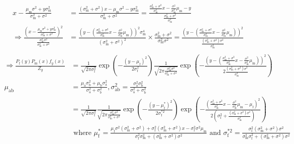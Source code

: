 \documentclass{article}\usepackage[]{graphicx}\usepackage[]{color}
\newcommand{\x}[1]{\text{#1}}
\begin{document}
\begin{landscape}
\begin{align*}
\\ x-\frac{\mu_\x{m}\sigma^2+y\sigma_\x{m}^2}{\sigma_\x{m}^2+\sigma^2}&=\frac{(\sigma_\x{m}^2+\sigma^2)x-\mu_\x{m}\sigma^2-y\sigma_\x{m}^2}{\sigma_\x{m}^2+\sigma^2}=\frac{\frac{\sigma_\x{m}^2+\sigma^2}{\sigma_\x{m}^2}x-\frac{\sigma^2}{\sigma_\x{m}^2}\mu_\x{m}-y}{\frac{\sigma_\x{m}^2+\sigma^2}{\sigma_\x{m}^2}}
\\ \Rightarrow \frac{(x-\frac{\mu_\x{m}\sigma^2+y\sigma_\x{m}^2}{\sigma_\x{m}^2+\sigma^2})^2}{\frac{\sigma_\x{m}^2\sigma^2}{\sigma_\x{m}^2+\sigma^2}}&=\frac{\left(y-\left(\frac{\sigma_\x{m}^2+\sigma^2}{\sigma_\x{m}^2}x-\frac{\sigma^2}{\sigma_\x{m}^2}\mu_\x{m}\right)\right)^2\sigma_\x{m}^4}{(\sigma_\x{m}^2+\sigma^2)^2}\times\frac{\sigma_\x{m}^2+\sigma^2}{\sigma_\x{m}^2\sigma^2}=\frac{\left(y-\left(\frac{\sigma_\x{m}^2+\sigma^2}{\sigma_\x{m}^2}x-\frac{\sigma^2}{\sigma_\x{m}^2}\mu_\x{m}\right)\right)^2}{\frac{(\sigma_\x{m}^2+\sigma^2)\sigma^2}{\sigma_\x{m}^2}}
\end{align*}
\begin{align*}
\\ \Rightarrow \frac{P_\x{f}(y)P_\x{m}(x)f_y(x)}{Z_y}&=\frac{1}{\sqrt{2\pi\sigma_\x{f}^2}}\exp\left(-\frac{(y-\mu_\x{f})^2}{2\sigma_\x{f}^2}\right)\frac{1}{\sqrt{2\pi\frac{\sigma_\x{m}^2\sigma^2}{\sigma_\x{m}^2+\sigma^2}}}\exp\left(-\frac{\left(y-\left(\frac{\sigma_\x{m}^2+\sigma^2}{\sigma_\x{m}^2}x-\frac{\sigma^2}{\sigma_\x{m}^2}\mu_\x{m}\right)\right)^2}{2\frac{(\sigma_\x{m}^2+\sigma^2)\sigma^2}{\sigma_\x{m}^2}}\right)
\\ \mu_\text{ab}&=\frac{\mu_\text{a}\sigma_\text{b}^2+\mu_\text{b}\sigma_\text{a}^2}{\sigma_\text{a}^2+\sigma_b^2}, \sigma_\text{ab}^2=\frac{\sigma_\text{a}^2\sigma_\text{b}^2}{\sigma_\text{a}^2+\sigma_\text{b}^2}
\\&=\frac{1}{\sqrt{2\pi\sigma_\x{f}^2}}\frac{1}{\sqrt{2\pi\frac{\sigma_\x{m}^2\sigma^2}{\sigma_\x{m}^2+\sigma^2}}}\exp\left(-\frac{(y-\mu_\x{f}^*)^2}{2\sigma_\x{f}^{*2}}\right)\exp\left(-\frac{\left(\frac{\sigma_\x{m}^2+\sigma^2}{\sigma_\x{m}^2}x-\frac{\sigma^2}{\sigma_\x{m}^2}\mu_\x{m}-\mu_\x{f}\right)^2}{2\left(\sigma_\x{f}^2+\frac{(\sigma_\x{m}^2+\sigma^2)\sigma^2}{\sigma_\x{m}^2}\right)}\right)
\\ & \text{ where } \mu_\x{f}^*=\frac{\mu_\x{f}\sigma^2(\sigma_\x{m}^2+\sigma^2)+\sigma_\x{f}^2(\sigma_\x{m}^2+\sigma^2)x-\sigma_\x{f}^2\sigma^2\mu_\x{m}}{\sigma_\x{f}^2\sigma_\x{m}^2+(\sigma_\x{m}^2+\sigma^2)\sigma^2} \text{ and } \sigma_\x{f}^{*2}=\frac{\sigma_\x{f}^2(\sigma_\x{m}^2+\sigma^2)\sigma^2}{\sigma_\x{m}^2\sigma_\x{f}^2+(\sigma_\x{m}^2+\sigma^2)\sigma^2}

\end{align*}
\end{landscape}
\end{document}
